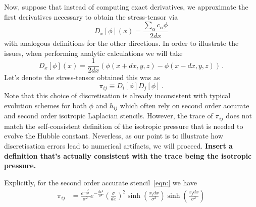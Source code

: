 \documentclass{revtex4}
\begin{document}
Now, suppose that instead of computing exact derivatives, we approximate the first derivatives necessary to obtain the stress-tensor via
\begin{equation}
  D_x[\phi](x) = \frac{\sum_{\alpha}c_\alpha \phi}{2dx}
\end{equation}
with analogous definitions for the other directions.
In order to illustrate the issues, when performing analytic calculations we will take
\begin{equation}
  D_x[\phi](x) = \frac{1}{2dx}\left(\phi(x+dx,y,z)-\phi(x-dx,y,z)\right) \, .
\end{equation}
Let's denote the stress-tensor obtained this was as
\begin{equation}
  \pi_{ij} \equiv D_i[\phi]D_j[\phi] \, .
\end{equation}
Note that this choice of discretisation is already inconsistent with typical evolution schemes for both $\phi$ and $h_{ij}$ which often rely on second order accurate and second order isotropic Laplacian stencils.   However, the trace of $\pi_{ij}$ does not match the self-consistent definition of the isotropic pressure that is needed to evolve the Hubble constant.
Neverless, as our point is to illustrate how discretisation errors lead to numerical artifacts, we will proceed.
{\bf Insert a definition that's actually consistent with the trace being the isotropic pressure.}

Explicitly, for the second order accurate stencil~\eqref{eqn:} we have
\begin{align}
  \pi_{ij} &= \frac{e^{-\frac{x^2}{\sigma^2}}}{\sigma^2}e^{-\frac{dx^2}{\sigma^2}}\left(\frac{\sigma}{dx}\right)^2\sinh\left(\frac{x_idx}{\sigma^2}\right)\sinh\left(\frac{x_jdx}{\sigma^2}\right) 
\end{align}
\end{document}
